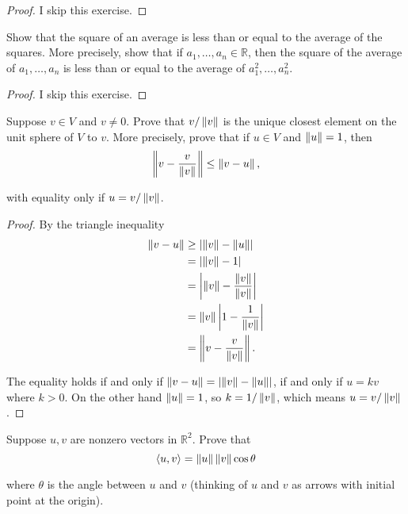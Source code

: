 \begin{proof}
    I skip this exercise.
\end{proof}
\newpage

\begin{exercise}
    Show that the square of an average is less than or equal to the average of the squares. More precisely, show that if $a_{1}, \ldots, a_{n} \in \mathbb{R}$, then the square of the average of $a_{1}, \ldots, a_{n}$ is less than or equal to the average of $a_{1}^{2}, \ldots, a_{n}^{2}$.
\end{exercise}

\begin{proof}
    I skip this exercise.
\end{proof}
\newpage

\begin{exercise}
    Suppose $v \in V$ and $v \ne 0$. Prove that $v/\left\Vert{v}\right\Vert$ is the unique closest element on the unit sphere of $V$ to $v$. More precisely, prove that if $u \in V$ and $\left\Vert{u}\right\Vert = 1$, then
    \[
        \left\Vert{v - \frac{v}{\left\Vert{v}\right\Vert}}\right\Vert\leq \left\Vert{v - u}\right\Vert,
    \]

    with equality only if $u = v/\left\Vert{v}\right\Vert$.
\end{exercise}

\begin{proof}
    By the triangle inequality
    \begin{align*}
        \left\Vert{v - u}\right\Vert & \geq \left\vert{\left\Vert{v}\right\Vert - \left\Vert{u}\right\Vert}\right\vert               \\
                     & = \left\vert{\left\Vert{v}\right\Vert - 1}\right\vert                         \\
                     & = \left\vert{\left\Vert{v}\right\Vert - \frac{\left\Vert{v}\right\Vert}{\left\Vert{v}\right\Vert}}\right\vert \\
                     & = \left\Vert{v}\right\Vert\left\vert{1 - \frac{1}{\left\Vert{v}\right\Vert}}\right\vert       \\
                     & = \left\Vert{v - \frac{v}{\left\Vert{v}\right\Vert}}\right\Vert.
    \end{align*}

    The equality holds if and only if $\left\Vert{v - u}\right\Vert = \left\vert{\left\Vert{v}\right\Vert - \left\Vert{u}\right\Vert}\right\vert$, if and only if $u = kv$ where $k > 0$. On the other hand $\left\Vert{u}\right\Vert = 1$, so $k = 1/\left\Vert{v}\right\Vert$, which means $u = v/\left\Vert{v}\right\Vert$.
\end{proof}
\newpage

\begin{exercise}\label{chapter6:sectionA:exercise15}
    Suppose $u, v$ are nonzero vectors in $\mathbb{R}^{2}$. Prove that
    \[
        \left\langle{u, v}\right\rangle = \left\Vert{u}\right\Vert\left\Vert{v}\right\Vert\cos\theta
    \]

    where $\theta$ is the angle between $u$ and $v$ (thinking of $u$ and $v$ as arrows with initial point at the origin).
\end{exercise}

